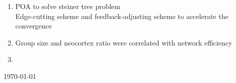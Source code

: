 \documentclass[a4paper,12pt]{article}
\begin{document}
\begin{enumerate}
	\item POA to solve steiner tree problem \cite{Liu_Physarum_2015}
	\\Edge-cutting scheme and feedback-adjusting scheme to accelerate the convergence
	

	\item Group size and neocortex ratio were correlated with network efficiency \cite{Pasquaretta_Social_2014}
	
	\item \cite{Patra_A_2011}


 \cite{Gurrutxaga_SEP_2010}	
 \cite{Askarzadeh_Bird_2014}
 \cite{Simon_Biogeography_2008}
 \cite{Kashan_An_2013}
 \cite{Kashan_An_2011}




\end{enumerate}
\today




\end{document}
